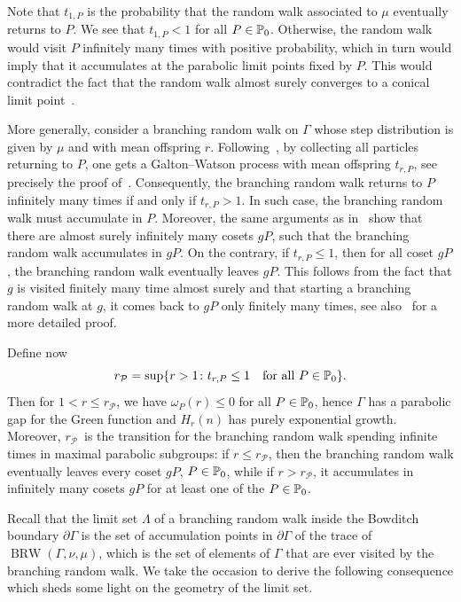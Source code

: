 \documentclass[10pt]{amsart}
\theoremstyle{definition}\newtheorem{defi}[theo]{Definition}\newtheorem{rema}[theo]{Remark}\newtheorem{exam}[theo]{Example}\newtheorem{exem}[theo]{Example}\newtheorem{nota}[theo]{Notation}
\newcommand{\bbP}{\mathbb{P}}
\newcommand{\clP}{\mathcal{P}}
\DeclareMathOperator{\BRW}{BRW}
\let\oldin\in
\renewcommand{\in}{\mathchoice{\oldin}{\oldin}{\,\oldin\,}{\,\oldin\,}}
\begin{document}
Note that $t_{1, P}$ is the probability that the random walk associated to $\mu$ eventually returns to $P$. We see that $t_{1, P} < 1$ for all $P \in \bbP_0$. Otherwise, the random walk would visit $P$ infinitely many times with positive probability, which in turn would imply that it accumulates at the parabolic limit points fixed by $P$. This would contradict the fact that the random walk almost surely converges to a conical limit point~\cite[Theorem~9.14]{GGPY}.



More generally, consider a branching random walk on $\Gamma$ whose step distribution is given by $\mu$ and with mean offspring $r$. Following~\cite{CandelleroGilchMuller}, by collecting all particles returning to $P$, one gets a Galton--Watson process with mean offspring $t_{r,P}$, see precisely the proof of~\cite[Proposition~4.3]{CandelleroGilchMuller}. Consequently, the branching random walk returns to $P$ infinitely many times if and only if $t_{r,P}>1$. In such case, the branching random walk must accumulate in $P$. Moreover, the same arguments as in~\cite[Proposition~4.4]{CandelleroGilchMuller} show that there are almost surely infinitely many cosets $gP$, such that the branching random walk accumulates in $gP$. On the contrary, if $t_{r,P}\leq 1$, then for all coset $gP$, the branching random walk eventually leaves $gP$. This follows from the fact that $g$ is visited finitely many time almost surely and that starting a branching random walk at $g$, it comes back to $gP$ only finitely many times, see also~\cite[Proposition~4.5]{CandelleroGilchMuller} for a more detailed proof.

Define now
\[
r_{\clP} = \sup \{ r > 1 \colon t_{r, P} \leq 1 \quad\text{for all } P \in \bbP_0 \}.
\]
Then for $1<r\leq r_\clP$, we have $\omega_P(r)\leq 0$ for all $P\in \bbP_0$, hence $\Gamma$ has a parabolic gap for the Green function and $H_r(n)$ has purely exponential growth. Moreover, $r_\clP$~is the transition for the branching random walk spending infinite times in maximal parabolic subgroups: if $r \leq r_\clP$, then the branching random walk eventually leaves every coset $gP$, $P\in \bbP_0$, while if $r>r_\clP$, it accumulates in infinitely many cosets $gP$ for at least one of the $P\in \bbP_0$.

Recall that the limit set $\Lambda$ of a branching random walk inside the Bowditch boundary $\partial\Gamma$ is the set of accumulation points in $\partial\Gamma$ of the trace of $\BRW(\Gamma,\nu,\mu)$, which is the set of elements of $\Gamma$ that are ever visited by the branching random walk. We take the occasion to derive the following consequence which sheds some light on the geometry of the limit set.
\end{document}
